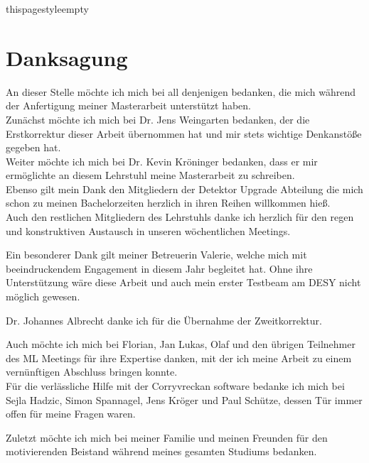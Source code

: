 thispagestyle{empty}
\section*{Danksagung}

An dieser Stelle möchte ich mich bei all denjenigen bedanken, die mich während
der Anfertigung meiner Masterarbeit unterstützt haben. \\
Zunächst möchte ich mich bei Dr. Jens Weingarten bedanken, der die Erstkorrektur dieser Arbeit übernommen hat und mir stets wichtige Denkanstöße
gegeben hat.\\
Weiter möchte ich mich bei Dr. Kevin Kröninger bedanken, dass er mir ermöglichte an diesem Lehrstuhl meine Masterarbeit zu schreiben. \\
Ebenso gilt mein Dank den Mitgliedern der Detektor Upgrade Abteilung die mich schon zu meinen Bachelorzeiten herzlich in ihren Reihen willkommen hieß. \\
Auch den restlichen Mitgliedern des Lehrstuhls danke ich herzlich für den regen und konstruktiven Austausch in unseren wöchentlichen Meetings.

Ein besonderer Dank gilt meiner Betreuerin Valerie, welche mich mit beeindruckendem Engagement in diesem Jahr begleitet hat. Ohne ihre Unterstützung wäre
diese Arbeit und auch mein erster Testbeam am DESY nicht möglich gewesen.

Dr. Johannes Albrecht danke ich für die Übernahme der Zweitkorrektur.

Auch möchte ich mich bei Florian, Jan Lukas, Olaf und den übrigen Teilnehmer des ML Meetings für ihre Expertise danken, mit der ich meine Arbeit zu einem vernünftigen
Abschluss bringen konnte. \\
Für die verlässliche Hilfe mit der Corryvreckan software bedanke ich mich bei Sejla Hadzic, Simon Spannagel, Jens Kröger und Paul Schütze, dessen Tür immer
offen für meine Fragen waren.

Zuletzt möchte ich mich bei meiner Familie und meinen Freunden für den motivierenden Beistand
während meines gesamten Studiums bedanken.
